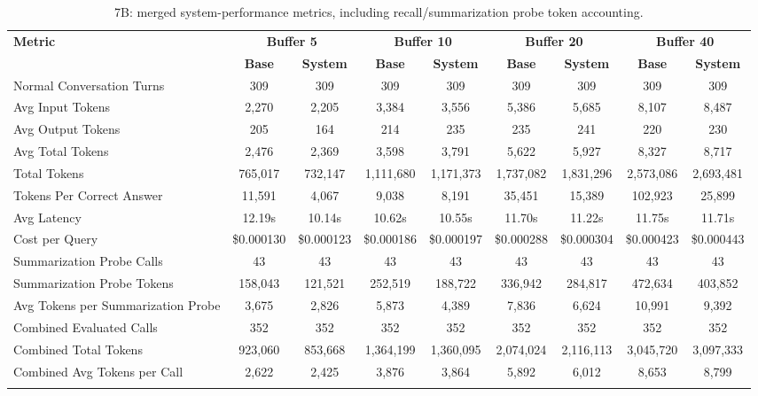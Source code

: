 \documentclass[pdflatex,sn-mathphys-num]{sn-jnl}%
\theoremstyle{thmstyleone}%
\theoremstyle{thmstyletwo}%
\theoremstyle{thmstylethree}%
\begin{document}
\begin{table}[htbp]
\caption{7B: merged system-performance metrics, including recall/summarization probe token accounting.}\label{tab:7b_perf_main}
\centering
\tiny
\setlength{\tabcolsep}{2.2pt}
\begin{adjustbox}{width=\textwidth}
\begin{tabular}{lcccccccc}
\toprule
\textbf{Metric} & \multicolumn{2}{c}{\textbf{Buffer 5}} & \multicolumn{2}{c}{\textbf{Buffer 10}} & \multicolumn{2}{c}{\textbf{Buffer 20}} & \multicolumn{2}{c}{\textbf{Buffer 40}} \\
\cmidrule(lr){2-3}\cmidrule(lr){4-5}\cmidrule(lr){6-7}\cmidrule(lr){8-9}
 & \textbf{Base} & \textbf{System} & \textbf{Base} & \textbf{System} & \textbf{Base} & \textbf{System} & \textbf{Base} & \textbf{System} \\
\midrule
Normal Conversation Turns & 309 & 309 & 309 & 309 & 309 & 309 & 309 & 309 \\
Avg Input Tokens & 2,270 & 2,205 & 3,384 & 3,556 & 5,386 & 5,685 & 8,107 & 8,487 \\
Avg Output Tokens & 205 & 164 & 214 & 235 & 235 & 241 & 220 & 230 \\
Avg Total Tokens & 2,476 & 2,369 & 3,598 & 3,791 & 5,622 & 5,927 & 8,327 & 8,717 \\
Total Tokens & 765,017 & 732,147 & 1,111,680 & 1,171,373 & 1,737,082 & 1,831,296 & 2,573,086 & 2,693,481 \\
Tokens Per Correct Answer & 11,591 & 4,067 & 9,038 & 8,191 & 35,451 & 15,389 & 102,923 & 25,899 \\
Avg Latency & 12.19s & 10.14s & 10.62s & 10.55s & 11.70s & 11.22s & 11.75s & 11.71s \\
Cost per Query & \$0.000130 & \$0.000123 & \$0.000186 & \$0.000197 & \$0.000288 & \$0.000304 & \$0.000423 & \$0.000443 \\
Summarization Probe Calls & 43 & 43 & 43 & 43 & 43 & 43 & 43 & 43 \\
Summarization Probe Tokens & 158,043 & 121,521 & 252,519 & 188,722 & 336,942 & 284,817 & 472,634 & 403,852 \\
Avg Tokens per Summarization Probe & 3,675 & 2,826 & 5,873 & 4,389 & 7,836 & 6,624 & 10,991 & 9,392 \\
Combined Evaluated Calls & 352 & 352 & 352 & 352 & 352 & 352 & 352 & 352 \\
Combined Total Tokens & 923,060 & 853,668 & 1,364,199 & 1,360,095 & 2,074,024 & 2,116,113 & 3,045,720 & 3,097,333 \\
Combined Avg Tokens per Call & 2,622 & 2,425 & 3,876 & 3,864 & 5,892 & 6,012 & 8,653 & 8,799 \\
\botrule
\end{tabular}
\end{adjustbox}
\end{table}
\end{document}
